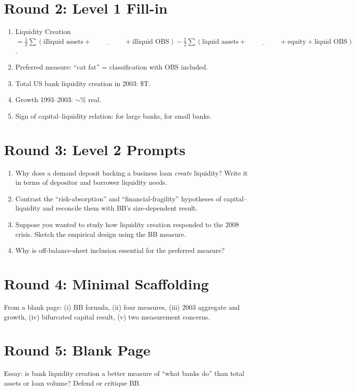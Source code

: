 \documentclass[11pt]{article}
\newcommand{\blank}[1]{\underline{\hspace{#1}}}
\begin{document}
\section*{Round 2: Level 1 Fill-in}
\begin{enumerate}
\item Liquidity Creation $= \tfrac12\sum(\text{illiquid assets}+\blank{2cm}+\text{illiquid OBS}) - \tfrac12\sum(\text{liquid assets}+\blank{2cm}+\text{equity}+\text{liquid OBS})$.
\item Preferred measure: ``cat fat'' = \blank{1.5cm} classification with OBS included.
\item Total US bank liquidity creation in 2003: \$\blank{1cm}T.
\item Growth 1993--2003: $\sim$\blank{1cm}\% real.
\item Sign of capital--liquidity relation: \blank{0.8cm} for large banks, \blank{0.8cm} for small banks.
\end{enumerate}

\section*{Round 3: Level 2 Prompts}
\begin{enumerate}
\item Why does a demand deposit backing a business loan \emph{create} liquidity? Write it in terms of depositor and borrower liquidity needs.
\item Contrast the ``risk-absorption'' and ``financial-fragility'' hypotheses of capital--liquidity and reconcile them with BB's size-dependent result.
\item Suppose you wanted to study how liquidity creation responded to the 2008 crisis. Sketch the empirical design using the BB measure.
\item Why is off-balance-sheet inclusion essential for the preferred measure?
\end{enumerate}

\section*{Round 4: Minimal Scaffolding}
From a blank page: (i) BB formula, (ii) four measures, (iii) 2003 aggregate and growth, (iv) bifurcated capital result, (v) two measurement concerns.

\section*{Round 5: Blank Page}
Essay: is bank liquidity creation a better measure of ``what banks do'' than total assets or loan volume? Defend or critique BB.
\end{document}
